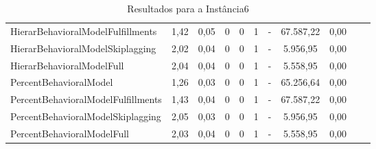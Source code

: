 \begin{table}[h!]
{\begin{tabular}{lcccccccccc}
			HierarBehavioralModelFulfillments  & 1,42   & 0,05 & 0 & 0   & 1 & -          & 67.587,22 & 0,00 \\ 
			HierarBehavioralModelSkiplagging   & 2,02   & 0,04 & 0 & 0   & 1 & -          & 5.956,95  & 0,00 \\ 
			HierarBehavioralModelFull          & 2,04   & 0,04 & 0 & 0   & 1 & -          & 5.558,95  & 0,00 \\ \hline
			PercentBehavioralModel             & 1,26   & 0,03 & 0 & 0   & 1 & -          & 65.256,64 & 0,00 \\ 
			PercentBehavioralModelFulfillments & 1,43   & 0,04 & 0 & 0   & 1 & -          & 67.587,22 & 0,00 \\ 
			PercentBehavioralModelSkiplagging  & 2,05   & 0,03 & 0 & 0   & 1 & -          & 5.956,95  & 0,00 \\ 
			PercentBehavioralModelFull         & 2,03   & 0,04 & 0 & 0   & 1 & -          & 5.558,95  & 0,00 \\ \hline
		\end{tabular}%
	}
	\caption{Resultados para a Instância6}
	\label{tab:resul_instan6}
\end{table}



